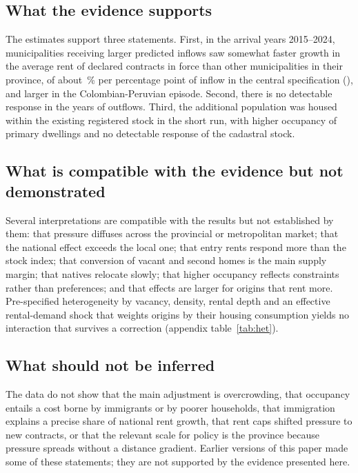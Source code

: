 \documentclass[11pt,a4paper]{article}
\begin{document}
\subsection{What the evidence supports}

The estimates support three statements. First, in the arrival years 2015--2024, municipalities receiving larger predicted inflows saw somewhat faster growth in the average rent of declared contracts in force than other municipalities in their province, of about \cenArrB\,\% per percentage point of inflow in the central specification (\cenArrAR), and larger in the Colombian-Peruvian episode. Second, there is no detectable response in the years of outflows. Third, the additional population was housed within the existing registered stock in the short run, with higher occupancy of primary dwellings and no detectable response of the cadastral stock.

\subsection{What is compatible with the evidence but not demonstrated}

Several interpretations are compatible with the results but not established by them: that pressure diffuses across the provincial or metropolitan market; that the national effect exceeds the local one; that entry rents respond more than the stock index; that conversion of vacant and second homes is the main supply margin; that natives relocate slowly; that higher occupancy reflects constraints rather than preferences; and that effects are larger for origins that rent more. Pre-specified heterogeneity by vacancy, density, rental depth and an effective rental-demand shock that weights origins by their housing consumption yields no interaction that survives a \citet{benjamini1995} correction (appendix table~\ref{tab:het}).

\subsection{What should not be inferred}

The data do not show that the main adjustment is overcrowding, that occupancy entails a cost borne by immigrants or by poorer households, that immigration explains a precise share of national rent growth, that rent caps shifted pressure to new contracts, or that the relevant scale for policy is the province because pressure spreads without a distance gradient. Earlier versions of this paper made some of these statements; they are not supported by the evidence presented here.
\end{document}
